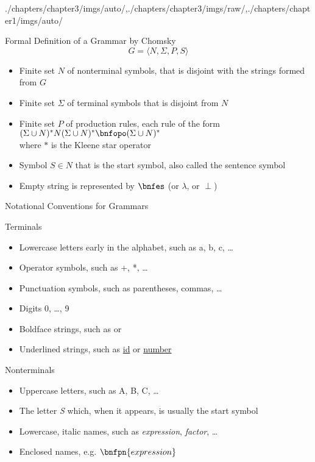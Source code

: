 \begin{graphicspathcontext}{{./chapters/chapter3/imgs/auto/},{./chapters/chapter3/imgs/raw/},{./chapters/chapter1/imgs/auto/}}
\begin{bibunit}[apalike]
\begin{frame}[t,background=9]{{Formal Definition} of a Grammar by Chomsky}
	\[
		G = \langle N, \Sigma, P, S\rangle
	\]
	\begin{itemize}
		\item Finite set $N$ of nonterminal symbols, that is disjoint with the strings formed from $G$
		\item Finite set $\Sigma$ of terminal symbols that is disjoint from $N$
		\item Finite set $P$ of production rules, each rule of the form $(\Sigma \cup N)^* N(\Sigma \cup N)^* \bnfopo (\Sigma \cup N)^*$ \\
		where $*$ is the Kleene star operator
		\item Symbol $S \in N$ that is the start symbol, also called the sentence symbol
		\item Empty string is represented by $\bnfes$ (or $\lambda$, or $\perp$)
	\end{itemize}
	\vspace{1cm}
\end{frame}

\begin{frame}[t]{Notational Conventions for Grammars}
	\begin{block}{Terminals}
		\begin{itemize}
		\item Lowercase letters early in the alphabet, such as a, b, c, \dots
		\item Operator symbols, such as +, *, \dots
		\item Punctuation symbols, such as parentheses, commas, \dots
		\item Digits 0, \dots, 9
		\item Boldface strings, such as  or 
		\item Underlined strings, such as \underline{id} or \underline{number}
		\end{itemize}
	\end{block}
	\begin{block}{Nonterminals}
		\begin{itemize}
		\item Uppercase letters, such as A, B, C, \dots
		\item The letter \textit{S} which, when it appears, is usually the start symbol
		\item Lowercase, italic names, such as \textit{expression}, \textit{factor}, \dots
		\item Enclosed names, e.g. $\bnfpn{expression}$
		\end{itemize}
	\end{block}
\end{frame}


\end{bibunit}
\end{graphicspathcontext}
